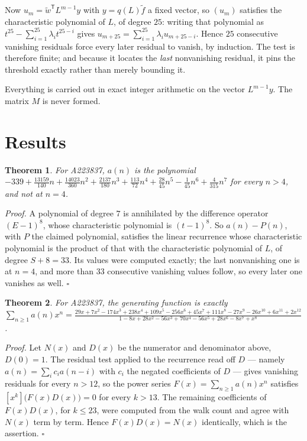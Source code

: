 \documentclass[11pt]{article}
\newtheorem{theorem}{Theorem}
\theoremstyle{definition}
\begin{document}
Now $u_m = \tilde w^{\mathsf T} L^{m-1} y$ with $y = q(L)\tilde f$ a fixed vector, so $(u_m)$ satisfies the characteristic polynomial of $L$, of degree $25$: writing that polynomial as $t^{25} - \sum_{i=1}^{25} \lambda_i t^{25-i}$ gives $u_{m+25} = \sum_{i=1}^{25} \lambda_i u_{m+25-i}$. Hence $25$ consecutive vanishing residuals force every later residual to vanish, by induction. The test is therefore finite; and because it locates the {\itshape last} nonvanishing residual, it pins the threshold exactly rather than merely bounding it.

Everything is carried out in exact integer arithmetic on the vector $L^{m-1}y$. The matrix $M$ is never formed.

\section{Results}

\begin{theorem} For A223837, $a(n)$ is the polynomial $-339 + \frac{13159}{140}n + \frac{14023}{360}n^{2} + \frac{2137}{180}n^{3} + \frac{113}{72}n^{4} + \frac{28}{45}n^{5} - \frac{1}{45}n^{6} + \frac{4}{315}n^{7}$ for every $n > 4$, and not at $n = 4$.\end{theorem}

{\itshape Proof.} A polynomial of degree $7$ is annihilated by the difference operator $(E-1)^{8}$, whose characteristic polynomial is $(t-1)^{8}$. So $a(n) - P(n)$, with $P$ the claimed polynomial, satisfies the linear recurrence whose characteristic polynomial is the product of that with the characteristic polynomial of $L$, of degree $S + 8 = 33$. Its values were computed exactly; the last nonvanishing one is at $n = 4$, and more than $33$ consecutive vanishing values follow, so every later one vanishes as well. $\square$

\begin{theorem} For A223837, the generating function is exactly $\sum_{n\ge 1} a(n)x^n = \frac{29x + 7x^{2} - 174x^{3} + 238x^{4} + 109x^{5} - 256x^{6} + 45x^{7} + 111x^{8} - 27x^{9} - 26x^{10} + 6x^{11} + 2x^{12}}{1 - 8x + 28x^{2} - 56x^{3} + 70x^{4} - 56x^{5} + 28x^{6} - 8x^{7} + x^{8}}$.\end{theorem}

{\itshape Proof.} Let $N(x)$ and $D(x)$ be the numerator and denominator above, $D(0)=1$. The residual test applied to the recurrence read off $D$ --- namely $a(n) = \sum_i c_i a(n-i)$ with $c_i$ the negated coefficients of $D$ --- gives vanishing residuals for every $n > 12$, so the power series $F(x)=\sum_{n\ge 1}a(n)x^n$ satisfies $[x^k]\bigl(F(x)D(x)\bigr) = 0$ for every $k > 13$. The remaining coefficients of $F(x)D(x)$, for $k \le 23$, were computed from the walk count and agree with $N(x)$ term by term. Hence $F(x)D(x) = N(x)$ identically, which is the assertion. $\square$
\end{document}
